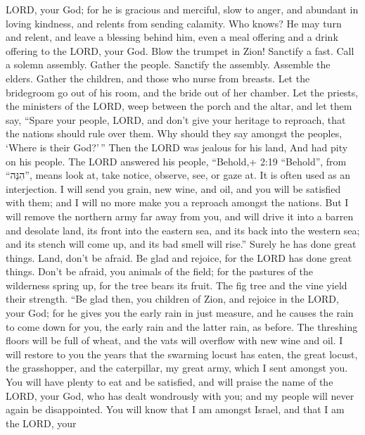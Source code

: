 LORD, your God; for he is gracious and merciful, slow to anger, and
abundant in loving kindness, and relents from sending calamity.
 Who knows? He may turn and relent, and leave a blessing
behind him, even a meal offering and a drink offering to the LORD, your
God.  Blow the trumpet in Zion! Sanctify a fast. Call a
solemn assembly.  Gather the people. Sanctify the assembly.
Assemble the elders. Gather the children, and those who nurse from
breasts. Let the bridegroom go out of his room, and the bride out of her
chamber.  Let the priests, the ministers of the LORD, weep
between the porch and the altar, and let them say, ``Spare your people,
LORD, and don't give your heritage to reproach, that the nations should
rule over them. Why should they say amongst the peoples, `Where is their
God?'\,''  Then the LORD was jealous for his land, And had
pity on his people.  The LORD answered his people,
``Behold,+ 2:19 ``Behold'', from ``הִנֵּה'', means look at, take notice,
observe, see, or gaze at. It is often used as an interjection. I will
send you grain, new wine, and oil, and you will be satisfied with them;
and I will no more make you a reproach amongst the nations.
 But I will remove the northern army far away from you, and
will drive it into a barren and desolate land, its front into the
eastern sea, and its back into the western sea; and its stench will come
up, and its bad smell will rise.'' Surely he has done great things.
 Land, don't be afraid. Be glad and rejoice, for the LORD
has done great things.  Don't be afraid, you animals of the
field; for the pastures of the wilderness spring up, for the tree bears
its fruit. The fig tree and the vine yield their strength. 
``Be glad then, you children of Zion, and rejoice in the LORD, your God;
for he gives you the early rain in just measure, and he causes the rain
to come down for you, the early rain and the latter rain, as before.
 The threshing floors will be full of wheat, and the vats
will overflow with new wine and oil.  I will restore to you
the years that the swarming locust has eaten, the great locust, the
grasshopper, and the caterpillar, my great army, which I sent amongst
you.  You will have plenty to eat and be satisfied, and
will praise the name of the LORD, your God, who has dealt wondrously
with you; and my people will never again be disappointed. 
You will know that I am amongst Israel, and that I am the LORD, your

